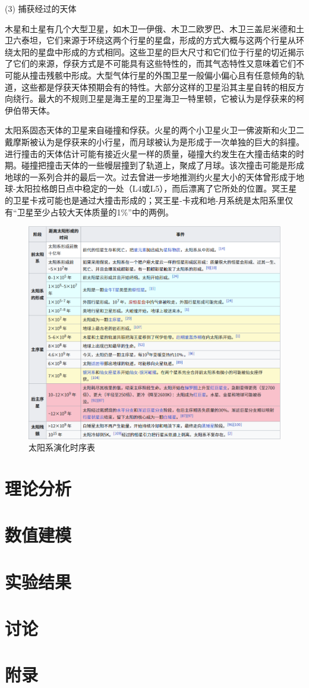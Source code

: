 \documentclass[hidelinks]{article}
\begin{document}
    (3) 捕获经过的天体
    
木星和土星有几个大型卫星，如木卫一伊俄、木卫二欧罗巴、木卫三盖尼米德和土卫六泰坦，它们来源于环绕这两个行星的星盘，形成的方式大概与这两个行星从环绕太阳的星盘中形成的方式相同。这些卫星的巨大尺寸和它们位于行星的切近揭示了它们的来源，俘获方式是不可能具有这些特性的，而其气态特性又意味着它们不可能从撞击残骸中形成。大型气体行星的外围卫星一般偏小偏心且有任意倾角的轨道，这些都是俘获天体预期会有的特性。大部分这样的卫星沿其主星自转的相反方向绕行。最大的不规则卫星是海王星的卫星海卫一特里顿，它被认为是俘获来的柯伊伯带天体。

太阳系固态天体的卫星来自碰撞和俘获。火星的两个小卫星火卫一佛波斯和火卫二戴摩斯被认为是俘获来的小行星，而月球被认为是形成于一次单独的巨大的斜撞。进行撞击的天体估计可能有接近火星一样的质量，碰撞大约发生在大撞击结束的时期。碰撞把撞击天体的一些幔层撞到了轨道上，聚成了月球。该次撞击可能是形成地球的一系列合并的最后一次。过去曾进一步地推测约火星大小的天体曾形成于地球-太阳拉格朗日点中稳定的一处（L4或L5），而后漂离了它所处的位置。冥王星的卫星卡戎可能也是通过大撞击形成的；冥王星-卡戎和地-月系统是太阳系里仅有“卫星至少占较大天体质量的1\%”中的两例。
\begin{figure}
    \centering
    \includegraphics[width=0.5\linewidth]{images/time_list.png}
    \caption{太阳系演化时序表}
    \label{fig:enter-label}
\end{figure}
\section{理论分析}

\section{数值建模}


\section{实验结果}

\section{讨论}

\section{附录}
\end{document}
